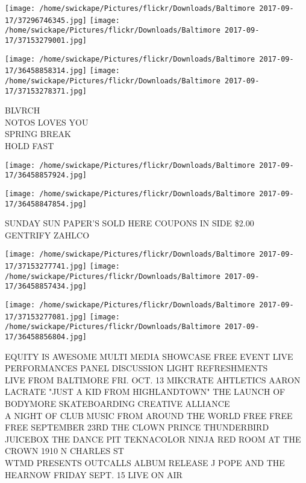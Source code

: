 \documentclass[10pt,letterpaper]{article}
\begin{document}
\texttt{[image: /home/swickape/Pictures/flickr/Downloads/Baltimore 2017-09-17/37296746345.jpg]}
\texttt{[image: /home/swickape/Pictures/flickr/Downloads/Baltimore 2017-09-17/37153279001.jpg]}

\texttt{[image: /home/swickape/Pictures/flickr/Downloads/Baltimore 2017-09-17/36458858314.jpg]}
\texttt{[image: /home/swickape/Pictures/flickr/Downloads/Baltimore 2017-09-17/37153278371.jpg]}

BLVRCH\\
NOTOS LOVES YOU\\
SPRING BREAK\\
HOLD FAST\\
\pagebreak

\texttt{[image: /home/swickape/Pictures/flickr/Downloads/Baltimore 2017-09-17/36458857924.jpg]}

\vspace{0.25in}
\texttt{[image: /home/swickape/Pictures/flickr/Downloads/Baltimore 2017-09-17/36458847854.jpg]}

SUNDAY SUN PAPER'S SOLD HERE COUPONS IN SIDE \$2.00\\
GENTRIFY ZAHLCO\\
\pagebreak

\texttt{[image: /home/swickape/Pictures/flickr/Downloads/Baltimore 2017-09-17/37153277741.jpg]}
\texttt{[image: /home/swickape/Pictures/flickr/Downloads/Baltimore 2017-09-17/36458857434.jpg]}

\texttt{[image: /home/swickape/Pictures/flickr/Downloads/Baltimore 2017-09-17/37153277081.jpg]}
\texttt{[image: /home/swickape/Pictures/flickr/Downloads/Baltimore 2017-09-17/36458856804.jpg]}

EQUITY IS AWESOME MULTI MEDIA SHOWCASE FREE EVENT LIVE PERFORMANCES PANEL DISCUSSION LIGHT REFRESHMENTS\\
LIVE FROM BALTIMORE FRI. OCT. 13 MIKCRATE AHTLETICS AARON LACRATE "JUST A KID FROM HIGHLANDTOWN" THE LAUNCH OF BODYMORE SKATEBOARDING CREATIVE ALLIANCE\\
A NIGHT OF CLUB MUSIC FROM AROUND THE WORLD FREE FREE FREE SEPTEMBER 23RD THE CLOWN PRINCE THUNDERBIRD JUICEBOX THE DANCE PIT TEKNACOLOR NINJA RED ROOM AT THE CROWN 1910 N CHARLES ST\\
WTMD PRESENTS OUTCALLS ALBUM RELEASE J POPE AND THE HEARNOW FRIDAY SEPT. 15 LIVE ON AIR\\
\pagebreak
\end{document}
